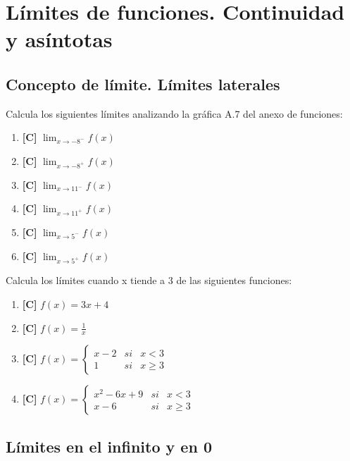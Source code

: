 \chapter{Límites de funciones. Continuidad y asíntotas}
\setcounter{exercicio}{0}

\section {Concepto de límite. Límites laterales}
\Exercicio Calcula los siguientes límites analizando la gráfica A.7 del anexo de funciones:
\begin{enumerate}[topsep=0pt]
	\item \textbf{[C]} $ \lim_{x \to -8^-} f(x) $
	\item \textbf{[C]} $ \lim_{x \to -8^+} f(x) $
	\item \textbf{[C]} $ \lim_{x \to 11^-} f(x) $
	\item \textbf{[C]} $ \lim_{x \to 11^+} f(x) $
	\item \textbf{[C]} $ \lim_{x \to 5^-} f(x) $
	\item \textbf{[C]} $ \lim_{x \to 5^+} f(x) $
\end{enumerate}


\Exercicio Calcula los límites cuando x tiende a 3 de las siguientes funciones:
\begin{enumerate}[topsep=0pt]
	\item \textbf{[C]} $ f(x) = 3x + 4 $
	\item \textbf{[C]} $ f(x) = \frac{1}{x} $
	\item \textbf{[C]} $ f(x) = \left\{ \begin{array}{lcc}
						x - 2 &   si  & x < 3 \\
						1 &  si & x \ge 3
						\end{array}
						\right.$
	\item \textbf{[C]} $ f(x) = \left\{ \begin{array}{lcc}
						x^2 -6x + 9 &   si  & x < 3 \\
						x-6 &  si & x \ge 3
						\end{array}
						\right.$
\end{enumerate}


\section{Límites en el infinito y en 0}

